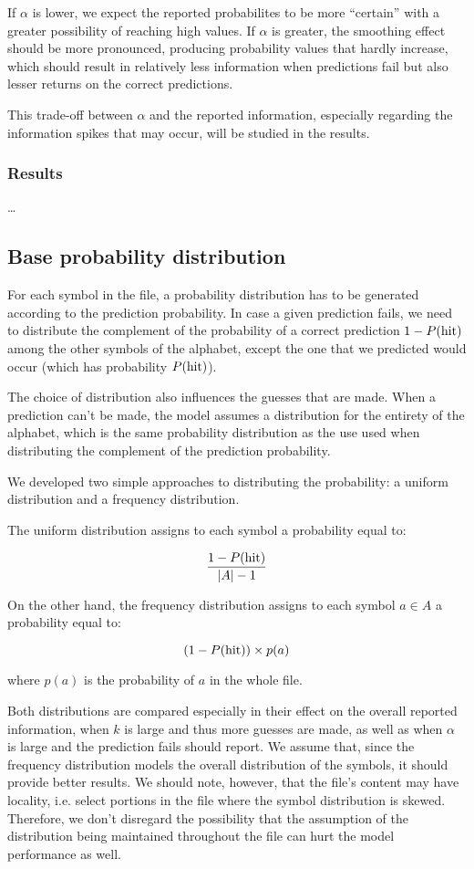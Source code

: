 \documentclass{article}
\begin{document}
If $\alpha$ is lower, we expect the reported probabilites to be more ``certain'' with a greater possibility of reaching high values.
If $\alpha$ is greater, the smoothing effect should be more pronounced, producing probability values that hardly increase, which should result in relatively less information when predictions fail but also lesser returns on the correct predictions.

This trade-off between $\alpha$ and the reported information, especially regarding the information spikes that may occur, will be studied in the results.

\subsubsection{Results}

\dots

\subsection{Base probability distribution}

For each symbol in the file, a probability distribution has to be generated according to the prediction probability.
In case a given prediction fails, we need to distribute the complement of the probability of a correct prediction $1 - P(\textnormal{hit})$ among the other symbols of the alphabet, except the one that we predicted would occur (which has probability $P(\textnormal{hit})$).

The choice of distribution also influences the guesses that are made.
When a prediction can't be made, the model assumes a distribution for the entirety of the alphabet, which is the same probability distribution as the use used when distributing the complement of the prediction probability.

We developed two simple approaches to distributing the probability: a uniform distribution and a frequency distribution.

The uniform distribution assigns to each symbol a probability equal to:

$$
\frac{1 - P(\textnormal{hit})}{\vert A \vert - 1}
$$

On the other hand, the frequency distribution assigns to each symbol $a \in A$ a probability equal to:

$$
(1 - P(\textnormal{hit})) \times p(a)
$$

where $p(a)$ is the probability of $a$ in the whole file.

Both distributions are compared especially in their effect on the overall reported information, when $k$ is large and thus more guesses are made, as well as when $\alpha$ is large and the prediction fails should report.
We assume that, since the frequency distribution models the overall distribution of the symbols, it should provide better results.
We should note, however, that the file's content may have locality, i.e. select portions in the file where the symbol distribution is skewed.
Therefore, we don't disregard the possibility that the assumption of the distribution being maintained throughout the file can hurt the model performance as well.
\end{document}
